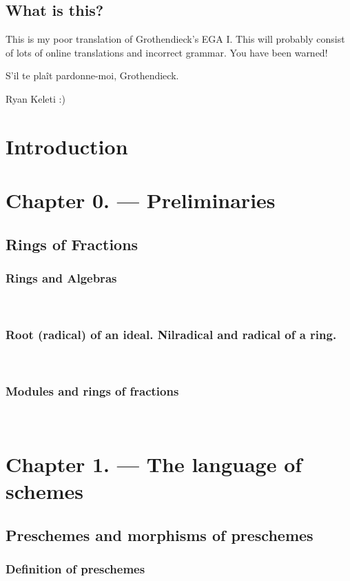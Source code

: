 \documentclass[10pt]{amsart}
\begin{document}
\maketitle
\tableofcontents{}

\subsection*{What is this?}

    This is my poor translation of Grothendieck's EGA I. This
    will probably consist of lots of online translations and incorrect grammar.
    You have been warned!

    S'il te pla\^it pardonne-moi, Grothendieck.

    Ryan Keleti :)


\section*{Introduction}




\section*{Chapter 0. --- Preliminaries}

    \subsection*{Rings of Fractions}

        \subsubsection*{Rings and Algebras}\mbox{}\\
        

        \subsubsection*{Root (radical) of an ideal. Nilradical and radical of a ring.}\mbox{}\\
        

        \subsubsection*{Modules and rings of fractions}\mbox{}\\
        



\section*{Chapter 1. --- The language of schemes}

    \subsection*{Preschemes and morphisms of preschemes}

        \subsubsection*{Definition of preschemes}\mbox{}\\
        
\end{document}
